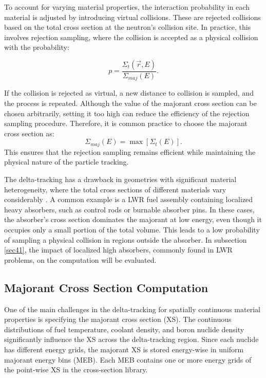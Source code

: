 To account for varying material properties, the interaction probability in each material is adjusted by introducing virtual collisions. These are rejected collisions based on the total cross section at the neutron’s collision site. In practice, this involves rejection sampling, where the collision is accepted as a physical collision with the probability:

\[
    p = \frac{\Sigma_t(\vec{r},E)}{\Sigma_{maj}(E)}.
\]

If the collision is rejected as virtual, a new distance to collision is sampled, and the process is repeated. Although the value of the majorant cross section can be chosen arbitrarily, setting it too high can reduce the efficiency of the rejection sampling procedure. Therefore, it is common practice to choose the majorant cross section as:
\[
    \Sigma_{maj}(E) = \max{\left[\Sigma_t(E)\right]}.
\]
This ensures that the rejection sampling remains efficient while maintaining the physical nature of the particle tracking.

The delta-tracking has a drawback in geometries with significant material heterogeneity, where the total cross sections of different materials vary considerably \cite{leppanen_2010}. A common example is a LWR fuel assembly containing localized heavy absorbers, such as control rods or burnable absorber pins. In these cases, the absorber's cross section dominates the majorant at low energy, even though it occupies only a small portion of the total volume. This leads to a low probability of sampling a physical collision in regions outside the absorber. In subsection \ref{sec41}, the impact of localized high absorbers, commonly found in LWR problems, on the computation will be evaluated.

\subsection{Majorant Cross Section Computation} \label{sec24}

One of the main challenges in the delta-tracking for spatially continuous material properties is specifying the majorant cross section (XS). The continuous distributions of fuel temperature, coolant density, and boron nuclide density significantly influence the XS across the delta-tracking region. Since each nuclide has different energy grids, the majorant XS is stored energy-wise in uniform majorant energy bins (MEB). Each MEB contains one or more energy grids of the point-wise XS in the cross-section library.

